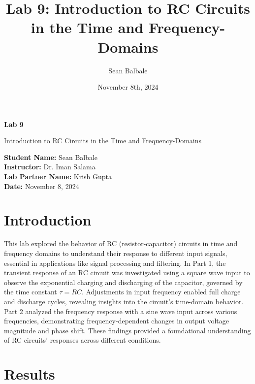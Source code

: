 \documentclass[12pt]{article}
\title{Lab 9: Introduction to RC Circuits in the Time and Frequency-Domains}
\author{Sean Balbale}
\date{November 8th, 2024}
\begin{document}
\begin{titlepage}
	\begin{center}
		\vspace*{1in}

		\Huge
		\textbf{Lab 9}

		\LARGE
		Introduction to RC Circuits in the Time and Frequency-Domains

		\vspace{3 in}

		\textbf{Student Name:} Sean Balbale
		\\ \textbf{Instructor:} Dr. Iman Salama
		\\ \textbf{Lab Partner Name:} Krish Gupta
		\\ \textbf{Date:} November 8, 2024

		\vfill


	\end{center}
\end{titlepage}

\newpage

\section{Introduction} 
This lab explored the behavior of RC (resistor-capacitor) circuits in 
time and frequency domains to understand their response to different 
input signals, essential in applications like signal processing and 
filtering. In Part 1, the transient response of an RC circuit was 
investigated using a square wave input to observe the exponential 
charging and discharging of the capacitor, governed by the time 
constant \(\tau = RC\). Adjustments in input frequency enabled full 
charge and discharge cycles, revealing insights into the circuit's 
time-domain behavior. Part 2 analyzed the frequency response with a 
sine wave input across various frequencies, demonstrating 
frequency-dependent changes in output voltage magnitude and phase 
shift. These findings provided a foundational understanding of 
RC circuits’ responses across different conditions.


\section{Results}
\end{document}
